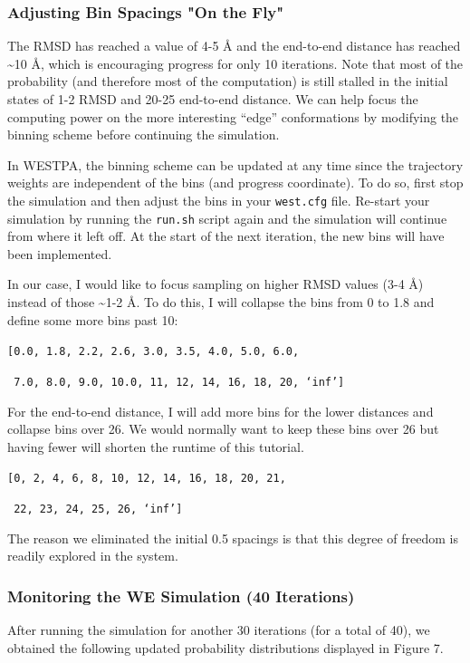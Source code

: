 \documentclass[9pt,tutorial]{livecoms}
\begin{document}
\subsubsection{Adjusting Bin Spacings "On the Fly"}

The RMSD has reached a value of 4-5 \AA{} and the end-to-end distance has reached \textasciitilde 10 \AA{}, which is encouraging progress for only 10 iterations. 
Note that most of the probability (and therefore most of the computation) is still stalled in the initial states of 1-2 RMSD and 20-25 end-to-end distance. 
We can help  focus the computing power on the more interesting “edge” conformations by modifying the binning scheme before continuing the simulation.
  
In WESTPA, the binning scheme can be updated at any time since the trajectory weights are independent of the bins (and progress coordinate). 
To do so, first stop the simulation and then adjust the bins in your \verb|west.cfg| file. 
Re-start your simulation by running the \verb|run.sh| script again and the simulation will continue from where it left off. 
At the start of the next iteration, the new bins will have been implemented.  

In our case, I would like to focus sampling on higher RMSD values (3-4 \AA) instead of those \textasciitilde 1-2 \AA. 
To do this, I will collapse the bins from 0 to 1.8 and define some more bins past 10:

\verb|[0.0, 1.8, 2.2, 2.6, 3.0, 3.5, 4.0, 5.0, 6.0,|

\verb| 7.0, 8.0, 9.0, 10.0, 11, 12, 14, 16, 18, 20, ‘inf’]|

For the end-to-end distance, I will add more bins for the lower distances and collapse bins over 26. 
We would normally want to keep these bins over 26 but having fewer will shorten the runtime of this tutorial.

\verb|[0, 2, 4, 6, 8, 10, 12, 14, 16, 18, 20, 21,|

\verb| 22, 23, 24, 25, 26, ‘inf’]|

The reason we eliminated the initial 0.5 spacings is that this degree of freedom is readily explored in the system.

\subsubsection{Monitoring the WE Simulation (40 Iterations)}

After running the simulation for another 30 iterations (for a total of 40), we obtained the following updated probability distributions displayed in Figure 7.
\end{document}
